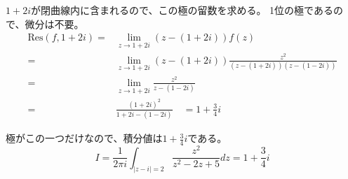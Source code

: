 \documentclass[10pt,b5paper]{ltjsarticle}
\begin{document}
\begin{enumerate}
      $1+2i$が閉曲線内に含まれるので、この極の留数を求める。
      1位の極であるので、微分は不要。
      \begin{align}
       \mathrm{Res}(f,1+2i) =& \lim_{z\rightarrow 1+2i}(z-(1+2i))f(z)\\
           =& \lim_{z\rightarrow 1+2i}(z-(1+2i))\frac{z^2}{(z-(1+2i))(z-(1-2i))}\\
           =& \lim_{z\rightarrow 1+2i}\frac{z^2}{z-(1-2i)}\\
           =& \frac{(1+2i)^2}{1+2i-(1-2i)} \quad = 1+\frac{3}{4}i
      \end{align}

      極がこの一つだけなので、積分値は$1+\frac{3}{4}i$である。
      \begin{equation}
       I = \frac{1}{2\pi i}\int_{\lvert z-i \rvert = 2}\frac{z^2}{z^2-2z+5}dz =1+\frac{3}{4}i
      \end{equation}

\end{enumerate}
\end{document}
